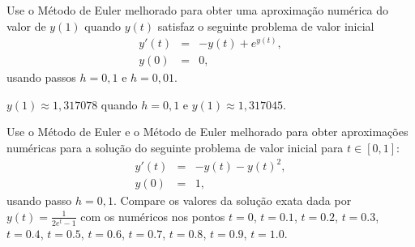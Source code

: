 \begin{Exercise} Use o Método de Euler melhorado para obter uma aproximação numérica do valor de $y(1)$ quando $y(t)$ satisfaz o seguinte problema de valor inicial
\begin{eqnarray*}
 y'(t)&=&-y(t)+ e^{y(t)},\\
 y(0)&=&0,
\end{eqnarray*}
usando passos $h=0,1$ e $h=0,01$.
\end{Exercise}
\begin{Answer}
  \begin{tiny}
 $y(1)\approx 1,317078$ quando $h=0,1$ e $y(1)\approx 1,317045$.    
  \end{tiny}
\end{Answer}


\begin{Exercise}Use o Método de Euler e o Método de Euler melhorado para obter aproximações numéricas para a solução do seguinte problema de valor inicial para $t\in[0,1]$:
\begin{eqnarray*}
 y'(t)&=&-y(t)- y(t)^2,\\
 y(0)&=&1,
\end{eqnarray*}
usando passo $h=0,1$. Compare os valores da solução exata dada por $y(t)=\frac{1}{2e^t-1}$ com os numéricos nos pontos $t=0$, $t=0.1$, $t=0.2$, $t=0.3$, $t=0.4$, $t=0.5$, $t=0.6$, $t=0.7$, $t=0.8$, $t=0.9$, $t=1.0$.
\end{Exercise}
